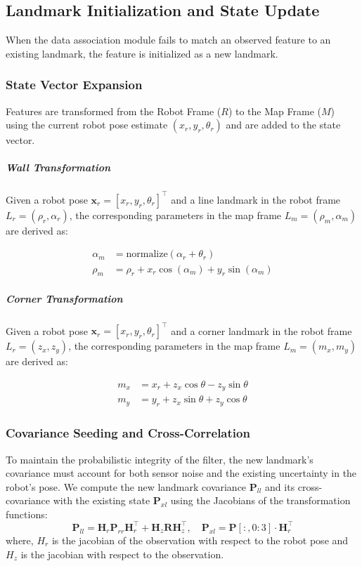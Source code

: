 \documentclass[11pt]{article}
\begin{document}
\subsection{Landmark Initialization and State Update}

When the data association module fails to match an observed feature to an existing landmark, the feature is initialized as a new landmark. 

\subsubsection{State Vector Expansion}
Features are transformed from the Robot Frame ($R$) to the Map Frame ($M$) using the current robot pose estimate $(x_r, y_r, \theta_r)$ and are added to the state vector.

\subparagraph{Wall Transformation}
Given a robot pose $\mathbf{x}_r = [x_r, y_r, \theta_r]^\top$ and a line landmark in the robot frame $L_r = (\rho_r, \alpha_r)$, the corresponding parameters in the map frame $L_m = (\rho_m, \alpha_m)$ are derived as:

\begin{align}
	\alpha_m &= \text{normalize}(\alpha_r + \theta_r) \\
	\rho_m   &= \rho_r + x_r \cos(\alpha_m) + y_r \sin(\alpha_m)
\end{align}

\subparagraph{Corner Transformation} Given a robot pose $\mathbf{x}_r = [x_r, y_r, \theta_r]^\top$ and a corner landmark in the robot frame $L_r = (z_x, z_y)$, the corresponding parameters in the map frame $L_m = (m_x, m_y)$ are derived as:

\begin{align}
	m_x &= x_r + z_x \cos \theta - z_y \sin \theta \\
	m_y &= y_r + z_x \sin \theta + z_y \cos \theta
\end{align}

\subsubsection{Covariance Seeding and Cross-Correlation}
To maintain the probabilistic integrity of the filter, the new landmark's covariance must account for both sensor noise and the existing uncertainty in the robot's pose. We compute the new landmark covariance $\mathbf{P}_{ll}$ and its cross-covariance with the existing state $\mathbf{P}_{xl}$ using the Jacobians of the transformation functions:
\begin{equation}
	\mathbf{P}_{ll} = \mathbf{H}_r \mathbf{P}_{rr} \mathbf{H}_r^\top + \mathbf{H}_z \mathbf{R} \mathbf{H}_z^\top, \quad \mathbf{P}_{xl} = \mathbf{P}[:, 0:3] \cdot \mathbf{H}_r^\top
\end{equation}
where, $H_r$ is the jacobian of the observation with respect to the robot pose and $H_z$ is the jacobian with respect to the observation.
\end{document}
